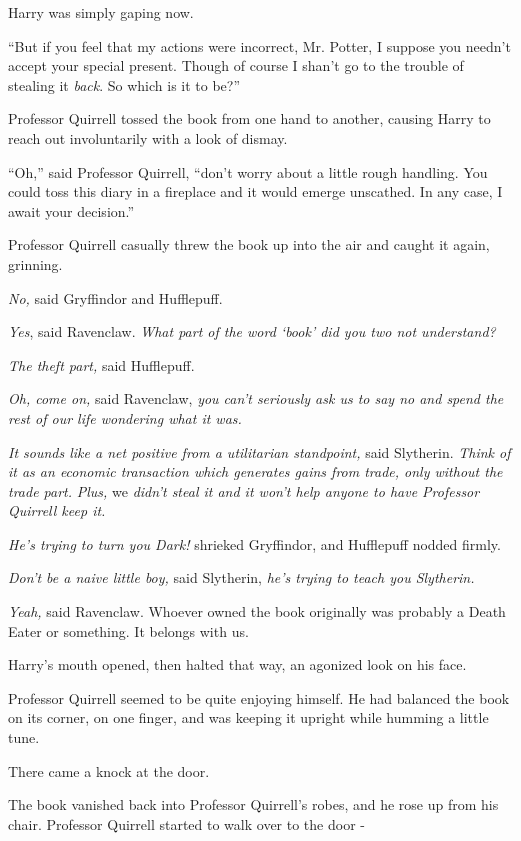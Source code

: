 Harry was simply gaping now.

``But if you feel that my actions were incorrect, Mr. Potter, I suppose
you needn't accept your special present. Though of course I shan't go to
the trouble of stealing it \emph{back}. So which is it to be?''

Professor Quirrell tossed the book from one hand to another, causing
Harry to reach out involuntarily with a look of dismay.

``Oh,'' said Professor Quirrell, ``don't worry about a little rough
handling. You could toss this diary in a fireplace and it would emerge
unscathed. In any case, I await your decision.''

Professor Quirrell casually threw the book up into the air and caught it
again, grinning.

\emph{No,} said Gryffindor and Hufflepuff.

\emph{Yes}, said Ravenclaw. \emph{What part of the word `book' did you
two not understand?}

\emph{The theft part,} said Hufflepuff.

\emph{Oh, come on,} said Ravenclaw, \emph{you can't seriously ask us to
say no and spend the rest of our life wondering what it was.}

\emph{It sounds like a net positive from a utilitarian standpoint,} said
Slytherin. \emph{Think of it as an economic transaction which generates
gains from trade, only without the trade part.} \emph{Plus,} we
\emph{didn't steal it and it won't help anyone to have Professor
Quirrell keep it.}

\emph{He's trying to turn you Dark!} shrieked Gryffindor, and Hufflepuff
nodded firmly.

\emph{Don't be a naive little boy,} said Slytherin, \emph{he's trying to
teach you Slytherin.}

\emph{Yeah,} said Ravenclaw. Whoever owned the book originally was
probably a Death Eater or something. It belongs with us.

Harry's mouth opened, then halted that way, an agonized look on his
face.

Professor Quirrell seemed to be quite enjoying himself. He had balanced
the book on its corner, on one finger, and was keeping it upright while
humming a little tune.

There came a knock at the door.

The book vanished back into Professor Quirrell's robes, and he rose up
from his chair. Professor Quirrell started to walk over to the door -

